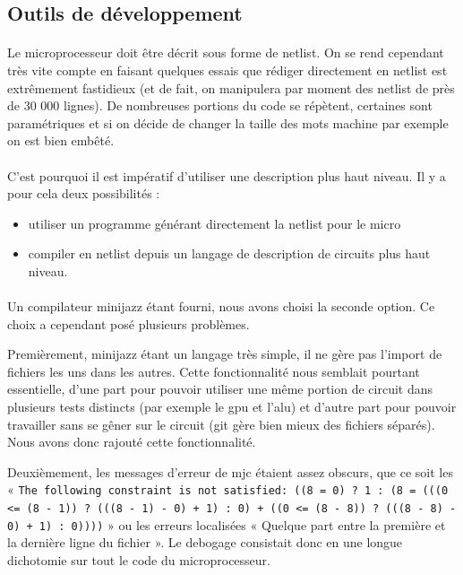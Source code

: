 \documentclass{article}
\begin{document}
\subsection{Outils de développement}

\paragraph{}Le microprocesseur doit être décrit sous forme de netlist. On se rend cependant très vite compte en faisant quelques essais que rédiger directement en netlist est extrêmement fastidieux (et de fait, on manipulera par moment des netlist de près de 30 000 lignes). De nombreuses portions du code se répètent, certaines sont paramétriques et si on décide de changer la taille des mots machine par exemple on est bien embêté.

\paragraph{}C'est pourquoi il est impératif d'utiliser une description plus haut niveau. Il y a pour cela deux possibilités :
\begin{itemize}
	\item utiliser un programme générant directement la netlist pour le micro
	\item compiler en netlist depuis un langage de description de circuits plus haut niveau.
\end{itemize}

\paragraph{}Un compilateur minijazz étant fourni, nous avons choisi la seconde option. Ce choix a cependant posé plusieurs problèmes.

Premièrement, minijazz étant un langage très simple, il ne gère pas l'import de fichiers les uns dans les autres. Cette fonctionnalité nous semblait pourtant essentielle, d'une part pour pouvoir utiliser une même portion de circuit dans plusieurs tests distincts (par exemple le gpu et l'alu) et d'autre part pour pouvoir travailler sans se gêner sur le circuit (git gère bien mieux des fichiers séparés). Nous avons donc rajouté cette fonctionnalité.

Deuxièmement, les messages d'erreur de mjc étaient assez obscurs, que ce soit les « \texttt{The following constraint is not satisfied: ((8 = 0) ? 1 : (8 = (((0 <= (8 - 1)) ? (((8 - 1) - 0) + 1) : 0) + ((0 <= (8 - 8)) ? (((8 - 8) - 0) + 1) : 0))))} » ou les erreurs localisées « Quelque part entre la première et la dernière ligne du fichier ». Le debogage consistait donc en une longue dichotomie sur tout le code du microprocesseur.
\end{document}
